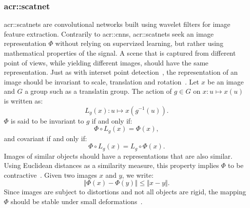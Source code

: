         \subsubsection{\acrlong*{acr::scatnet}}
            \glspl{acr::scatnet} are convolutional networks built using wavelet filters for image feature extraction.
            Contrarily to \glspl{acr::cnn}, \glspl{acr::scatnet} seek an image representation $\Phi$ without relying on supervized learning, but rather using mathematical properties of the signal.
            A scene that is captured from different point of views, while yielding different images, should have the same representation.
            Just as with interset point detection~\parencite{harris1988combined,lowe1999object}, the representation of an image should be invariant to scale, translation and rotation~\parencite{mallat2012group,sifre2013rotation,bruna2013invariant}.
            Let $x$ be an image and $G$ a group such as a translatin group.
            The action of $g\in G$ on $x: u \mapsto x(u)$ is written as:
            \begin{equation}
                \label{eq::action_group}
                L_g(x): u \mapsto x\left(g^{-1}(u)\right).
            \end{equation}
            $\Phi$ is said to be invariant to $g$ if and only if:
            \begin{equation}
                \label{eq::invariance}
                \Phi\circ L_g\left(x\right) = \Phi(x),
            \end{equation}
            and covariant if and only if:
            \begin{equation}
                \label{eq::covariance}
                \Phi\circ L_g\left(x\right) = L_g\circ\Phi(x).
            \end{equation}
            Images of similar objects should have a representations that are also similar.
            Using Euclidean distances as a similarity measure, this property implies $\Phi$ to be contractive~\parencite{bruna2013invariant}.
            Given two images $x$ and $y$, we write:
            \begin{equation}
                \label{eq::contractive}
                \Vert \Phi(x) - \Phi(y) \Vert \leq \Vert x-y \Vert.
            \end{equation}
            Since images are subject to distortions and not all objects are rigid, the mapping $\Phi$ should be stable under small deformations~\parencite{bruna2013invariant,sifre2013rotation,mallat2012group}.

